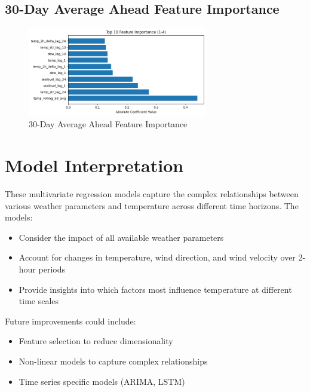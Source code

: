 \subsection{30-Day Average Ahead Feature Importance}
\begin{figure}[htbp]
\centering
\includegraphics[width=0.7\textwidth]{1-4-linear_temp_shift_feature_importance.png}
\caption{30-Day Average Ahead Feature Importance}
\label{fig:30-day_average_ahead_featimp}
\end{figure}


\section{Model Interpretation}

These multivariate regression models capture the complex relationships between various weather parameters and temperature across different time horizons. The models:\
\begin{itemize}
  \item Consider the impact of all available weather parameters
  \item Account for changes in temperature, wind direction, and wind velocity over 2-hour periods
  \item Provide insights into which factors most influence temperature at different time scales
\end{itemize}
Future improvements could include:\
\begin{itemize}
  \item Feature selection to reduce dimensionality
  \item Non-linear models to capture complex relationships
  \item Time series specific models (ARIMA, LSTM)
\end{itemize}

